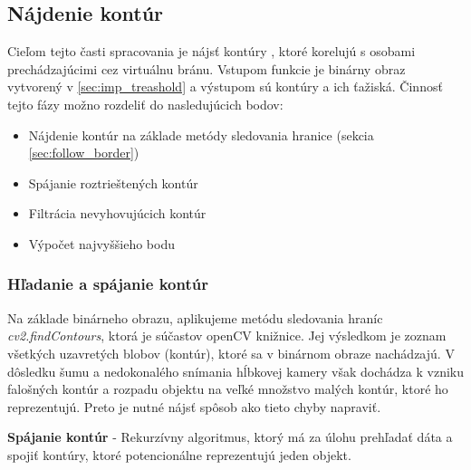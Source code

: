 \subsection{Nájdenie kontúr}
Cieľom tejto časti spracovania je nájsť kontúry , ktoré korelujú s osobami prechádzajúcimi cez virtuálnu bránu. Vstupom funkcie je binárny obraz vytvorený v \ref{sec:imp_treashold} a výstupom sú kontúry a ich  ťažiská. Činnosť tejto fázy možno rozdeliť do nasledujúcich bodov:  
\begin{itemize}
\item Nájdenie kontúr na základe metódy sledovania hranice (sekcia \ref{sec:follow_border})
\item Spájanie roztrieštených kontúr
\item Filtrácia nevyhovujúcich kontúr
\item Výpočet najvyššieho bodu 
\end{itemize}
\vspace{5mm}

\subsubsection{Hľadanie a spájanie kontúr}
Na základe binárneho obrazu, aplikujeme metódu sledovania hraníc \textit{cv2.findContours}, ktorá je súčastov openCV knižnice. Jej výsledkom je zoznam všetkých uzavretých blobov (kontúr), ktoré sa v binárnom obraze nachádzajú. V dôsledku šumu a nedokonalého snímania hĺbkovej kamery však dochádza k vzniku falošných kontúr a rozpadu objektu na veľké množstvo malých kontúr, ktoré ho reprezentujú. Preto je nutné nájsť spôsob ako tieto chyby napraviť. \vspace{5mm}

\textbf{Spájanie kontúr} - Rekurzívny algoritmus, ktorý má za úlohu prehľadať dáta a spojiť kontúry, ktoré potencionálne reprezentujú jeden objekt. 

